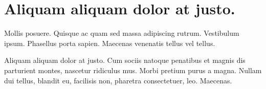 \section{Aliquam aliquam dolor at justo.}

Mollis posuere. Quisque ac quam sed  massa adipiscing rutrum.
Vestibulum ipsum. Phasellus porta sapien. Maecenas venenatis tellus
vel tellus.

Aliquam aliquam dolor at justo. Cum sociis natoque penatibus et magnis
dis parturient montes, nascetur ridiculus mus. Morbi pretium purus a
magna. Nullam dui tellus, blandit eu, facilisis non, pharetra
consectetuer, leo. Maecenas.

